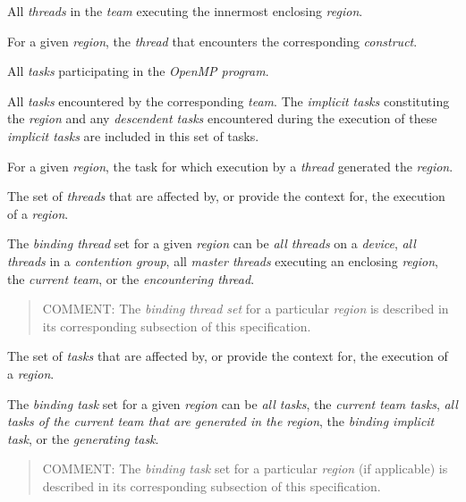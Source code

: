 \glossarydefstart
All \emph{threads} in the \emph{team} executing the innermost 
enclosing  \emph{region}.
\glossarydefend

\glossarydefstart
For a given \emph{region}, the \emph{thread} that encounters the
corresponding \emph{construct}.
\glossarydefend

\glossarydefstart
All \emph{tasks} participating in the \emph{OpenMP program}.
\glossarydefend

\glossarydefstart
All \emph{tasks} encountered by the corresponding \emph{team}. The 
\emph{implicit tasks} constituting the  \emph{region} 
and any \emph{descendent tasks} encountered during the execution of 
these \emph{implicit tasks} are included in this set of tasks.
\glossarydefend

\glossarydefstart
For a given \emph{region}, the task for which execution by a 
\emph{thread} generated the \emph{region}.
\glossarydefend

\glossarydefstart
The set of \emph{threads} that are affected by, or provide the context 
for, the execution of a \emph{region}.

The \emph{binding thread} set for a given \emph{region} can be 
\emph{all threads} on a \emph{device}, \emph{all threads} in a 
\emph{contention group}, all \emph{master threads} executing an
enclosing  \emph{region}, the \emph{current team}, 
or the \emph{encountering thread}.

\begin{quote}
COMMENT: The \emph{binding thread set} for a particular \emph{region} 
is described in its corresponding subsection of this specification.
\end{quote}
\glossarydefend

\glossarydefstart
The set of \emph{tasks} that are affected by, or provide the context for, 
the execution of a \emph{region}.

The \emph{binding task} set for a given \emph{region} can be \emph{all tasks},
the \emph{current team tasks}, 
\emph{all tasks of the current team that are generated in the region}, the 
\emph{binding implicit task}, or the \emph{generating task}.

\begin{quote}
COMMENT: The \emph{binding task} set for a particular \emph{region} (if 
applicable) is described in its corresponding subsection of this specification.
\end{quote}
\glossarydefend

